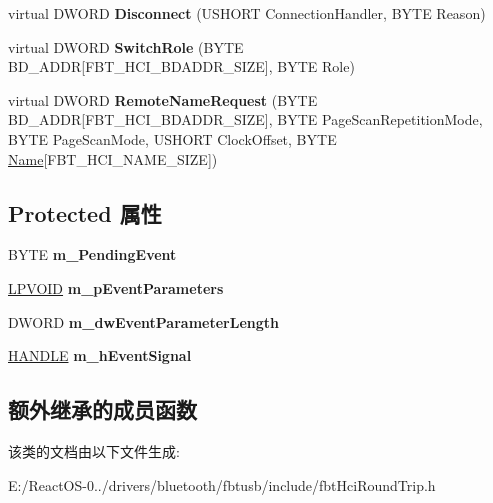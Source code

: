 \begin{DoxyCompactItemize}
\item 
\mbox{\label{class_c_hci_round_trip_a933fe5e03b1b859ab2c17011b92775a1}} 
virtual D\+W\+O\+RD {\bfseries Disconnect} (U\+S\+H\+O\+RT Connection\+Handler, B\+Y\+TE Reason)
\item 
\mbox{\label{class_c_hci_round_trip_a697595b4c3eee8f682cced984beff45e}} 
virtual D\+W\+O\+RD {\bfseries Switch\+Role} (B\+Y\+TE B\+D\+\_\+\+A\+D\+DR\mbox{[}F\+B\+T\+\_\+\+H\+C\+I\+\_\+\+B\+D\+A\+D\+D\+R\+\_\+\+S\+I\+ZE\mbox{]}, B\+Y\+TE Role)
\item 
\mbox{\label{class_c_hci_round_trip_ac20bc640a68dc05f7fe13ec64d31bd24}} 
virtual D\+W\+O\+RD {\bfseries Remote\+Name\+Request} (B\+Y\+TE B\+D\+\_\+\+A\+D\+DR\mbox{[}F\+B\+T\+\_\+\+H\+C\+I\+\_\+\+B\+D\+A\+D\+D\+R\+\_\+\+S\+I\+ZE\mbox{]}, B\+Y\+TE Page\+Scan\+Repetition\+Mode, B\+Y\+TE Page\+Scan\+Mode, U\+S\+H\+O\+RT Clock\+Offset, B\+Y\+TE \hyperlink{struct_name_rec__}{Name}\mbox{[}F\+B\+T\+\_\+\+H\+C\+I\+\_\+\+N\+A\+M\+E\+\_\+\+S\+I\+ZE\mbox{]})
\end{DoxyCompactItemize}
\subsection*{Protected 属性}
\begin{DoxyCompactItemize}
\item 
\mbox{\label{class_c_hci_round_trip_aca8683e768f3c1e18c53aa44f98705a0}} 
B\+Y\+TE {\bfseries m\+\_\+\+Pending\+Event}
\item 
\mbox{\label{class_c_hci_round_trip_aa82773336df383bcc3652e477182e59d}} 
\hyperlink{interfacevoid}{L\+P\+V\+O\+ID} {\bfseries m\+\_\+p\+Event\+Parameters}
\item 
\mbox{\label{class_c_hci_round_trip_a75a9a7914ffbb545776caa03786a8083}} 
D\+W\+O\+RD {\bfseries m\+\_\+dw\+Event\+Parameter\+Length}
\item 
\mbox{\label{class_c_hci_round_trip_abe050f98a938f9b5a71305ff73594bc9}} 
\hyperlink{interfacevoid}{H\+A\+N\+D\+LE} {\bfseries m\+\_\+h\+Event\+Signal}
\end{DoxyCompactItemize}
\subsection*{额外继承的成员函数}


该类的文档由以下文件生成\+:\begin{DoxyCompactItemize}
\item 
E\+:/\+React\+O\+S-\/0../drivers/bluetooth/fbtusb/include/fbt\+Hci\+Round\+Trip.\+h\end{DoxyCompactItemize}
